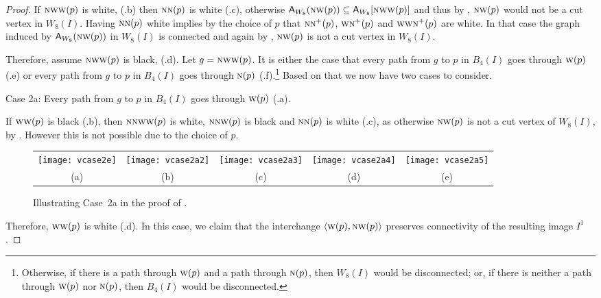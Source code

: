 \documentclass[lotsofwhite,charterfonts]{patmorin}
\newcommand{\N}{\textsc{n}}
\newcommand{\W}{\textsc{w}}
\newcommand{\NW}{\textsc{nw}}
\newcommand{\ic}[2]{\langle #1,#2 \rangle}
\newcommand{\A}[2]{\ensuremath{\protect\textup{\textsf{A}}_{#2}(#1)}}
\newcommand{\AC}[2]{\ensuremath{\protect\textup{\textsf{A}}_{#2}[#1]}}
\newcommand{\se}{\ensuremath{\subseteq}}
\begin{document}
\begin{proof}
If $\NW\W(p)$ is white, (.b) then $\N\N(p)$ is white
(.c), otherwise $\A{\NW(p)}{W_8}\se
\AC{\NW\W(p)}{W_8}$ and thus by , $\NW(p)$ would not
be a cut vertex in $W_8(I)$. Having $\N\N(p)$ white implies by the
choice of $p$ that $\N\N^+(p)$, $\W\N^+(p)$ and $\W\W\N^+(p)$ are
white. In that case the graph induced by \A{\NW(p)}{W_8} in $W_8(I)$
is connected and again by , $\NW(p)$ is not a cut
vertex in $W_8(I)$.


Therefore, assume $\NW\W(p)$ is black, (.d). Let
$g=\NW\W(p)$. It is either the case that every path from $g$ to $p$ in
$B_4(I)$ goes through $\W(p)$  (.e) or every path from
$g$ to $p$ in $B_4(I)$ goes through $\N(p)$
(.f).\footnote{Otherwise, if there is a path through
$\W(p)$ and a path through $\N(p)$, then $W_8(I)$ would be
disconnected; or, if there is neither a path through $\W(p)$ nor
$\N(p)$, then $B_4(I)$ would be disconnected.} Based on that we now
have two cases to consider.

\noindent Case 2a: Every path from $g$ to $p$ in $B_4(I)$ goes through
$\W(p)$ (.a). 

If $\W\W(p)$ is black (.b), then $\N\N\W\W(p)$ is white,
$\N\N\W(p)$ is black and  $\N\N(p)$ is white (.c), as
otherwise $\NW(p)$ is not a cut vertex of $W_8(I)$, by
. However this is not possible due to the choice of
$p$.

\begin{figure}[htbp]
\begin{center}
\begin{tabular}{ccccc}
\texttt{[image: vcase2e]} & 
\texttt{[image: vcase2a2]} & 
\texttt{[image: vcase2a3]} & 
\texttt{[image: vcase2a4]} &
\texttt{[image: vcase2a5]}
\\
(a) & (b) & (c) & (d) & (e)
\end{tabular}
\end{center}
\caption{Illustrating Case~2a in the proof of .}
\end{figure}

Therefore,  $\W\W(p)$ is white (.d). In this case, we claim that the interchange $\ic{\W(p)}{\NW(p)}$ preserves connectivity of the resulting image $I^1$. 



\end{proof}
\end{document}
